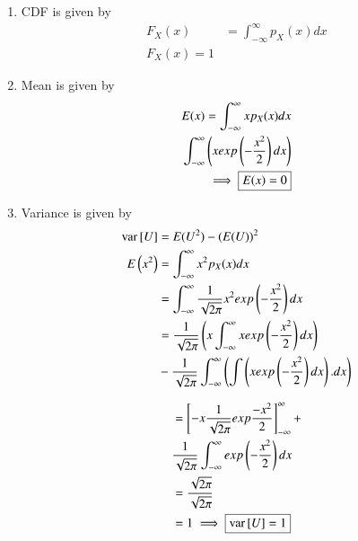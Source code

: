 \documentclass[journal,12pt,twocolumn]{IEEEtran}
\begin{document}
\solution 
\begin{enumerate}
    \item CDF is given by 
    \begin{align}
        F_X(x)&=\int_{-\infty}^{\infty}p_X(x)dx\\
        \boxed{F_X(x)=1}
    \end{align}
    \item Mean is given by
    \begin{align*}
        E(x)=\int_{-\infty}^{\infty}xp_X(x)dx\\
        \int_{-\infty}^{\infty} \left(x exp\left(-\frac{x^2}{2}\right)dx\right)\\
        \implies \boxed{E(x)=0}
    \end{align*}
    \item Variance is given by
    \begin{align*}
        \text{var}{}\left[U\right]&=E(U^2)-(E(U))^2\\
E\left(x^2\right)&=\int_{-\infty}^{\infty}x^2p_X(x)dx \\
&=\int_{-\infty}^{\infty}\frac{1}{\sqrt{2\pi}}x^2exp\left(-\frac{x^2}{2}\right)dx \\
&=\frac{1}{\sqrt{2\pi}}\left(x\int_{-\infty}^{\infty} x exp\left(-\frac{x^2}{2}\right)dx\right)
\\ &  -\frac{1}{\sqrt{2\pi}}\int_{-\infty}^{\infty}\left( \int \left(x exp\left(-\frac{x^2}{2}\right)dx\right). dx\right)\\
\end{align*}
    
\begin{align*}
&=\left[-x\frac{1}{\sqrt{2\pi}} exp{\frac{-x^2}{2}}\right]_{-\infty}^{\infty}+\\ &\frac{1}{\sqrt{2\pi}}\int_{-\infty}^{\infty}exp\left(-\frac{x^2}{2}\right)dx \\
&=\frac{\sqrt{2\pi}}{\sqrt{2\pi}}\\&=1
        \implies\boxed{\text{var}{}\left[U\right]=1}
    \end{align*}
\end{enumerate}
\end{document}
